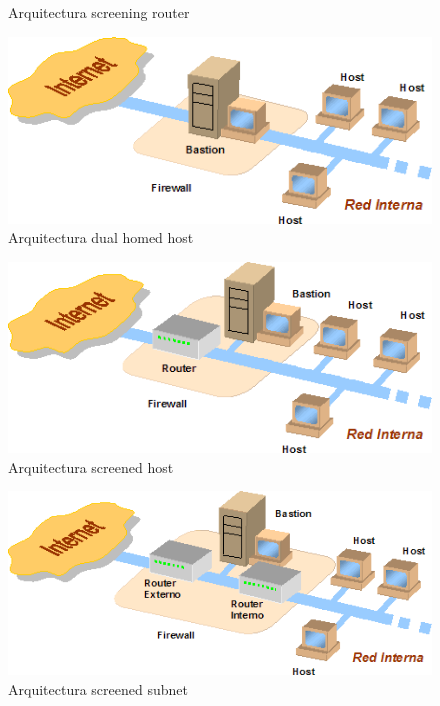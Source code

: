\begin{enumerate}
\begin{enumerate}
\begin{figure}[tphb]
  		   \caption{Arquitectura screening router \cite{firewall}}
  		   \label{img:screening-router}
\end{figure}
\begin{figure}[tphb]
  		   \centering
     		   \includegraphics[width=5in]{dual-homed-host.png}
  		   \caption{Arquitectura dual homed host \cite{firewall}}
  		   \label{img:dual-homed-host}
\end{figure}
\begin{figure}[tphb]
  		   \centering
     		   \includegraphics[width=5in]{screened-host.png}
  		   \caption{Arquitectura screened host \cite{firewall}}
  		   \label{img:screened-host}
\end{figure}
\begin{figure}[tphb]
  		   \centering
     		   \includegraphics[width=5in]{screened-subnet.png}
  		   \caption{Arquitectura screened subnet \cite{firewall}}
  		   \label{img:screened-subnet}

\end{figure}
\end{enumerate}
\end{enumerate}
